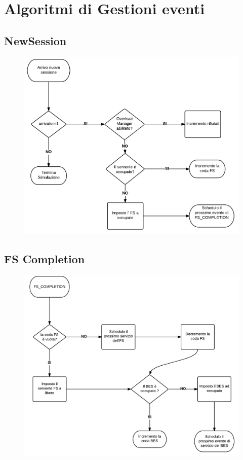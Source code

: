 \section{Algoritmi di Gestioni eventi}
\subsection{NewSession}
\begin{figure}[H]
  \centering
  \includegraphics[scale=0.35]{img/NewSession.png}
  \label{fig:NewSession}
\end{figure}
\subsection{FS Completion}
\begin{figure}[H]
  \centering
  \includegraphics[scale=0.35]{img/FS_Completion.png}
  \label{fig:FS_Completion}
\end{figure}


